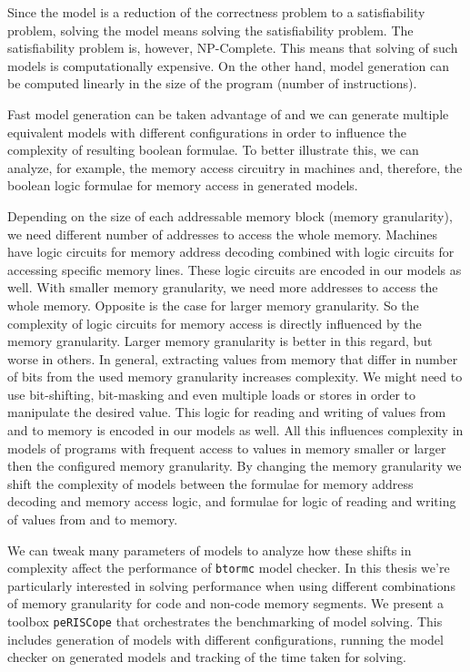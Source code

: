 \documentclass[12pt]{article}
\begin{document}
Since the model is a reduction of the correctness problem to a satisfiability
problem, solving the model means solving the satisfiability problem. The
satisfiability problem is, however, NP-Complete. This means that solving of
such models is computationally expensive. On the other hand, model generation
can be computed linearly in the size of the program (number of instructions).

Fast model generation can be taken advantage of and we can generate multiple
equivalent models with different configurations in order to influence the
complexity of resulting boolean formulae. To better illustrate this, we can
analyze, for example, the memory access circuitry in machines and, therefore,
the boolean logic formulae for memory access in generated models.

Depending on the size of each addressable memory block (memory granularity), we
need different number of addresses to access the whole memory. Machines have
logic circuits for memory address decoding combined with logic circuits for
accessing specific memory lines. These logic circuits are encoded in our models
as well. With smaller memory granularity, we need more addresses to access the
whole memory. Opposite is the case for larger memory granularity. So the
complexity of logic circuits for memory access is directly influenced by the
memory granularity. Larger memory granularity is better in this regard, but
worse in others. In general, extracting values from memory that differ in
number of bits from the used memory granularity increases complexity. We might
need to use bit-shifting, bit-masking and even multiple loads or stores in
order to manipulate the desired value. This logic for reading and writing of
values from and to memory is encoded in our models as well. All this influences
complexity in models of programs with frequent access to values in memory
smaller or larger then the configured memory granularity. By changing the
memory granularity we shift the complexity of models between the formulae for
memory address decoding and memory access logic, and formulae for logic of
reading and writing of values from and to memory.

We can tweak many parameters of models to analyze how these shifts in
complexity affect the performance of \texttt{btormc} model checker. In this
thesis we're particularly interested in solving performance when using
different combinations of memory granularity for code and non-code memory
segments. We present a toolbox \texttt{peRISCope} that orchestrates the
benchmarking of model solving. This includes generation of models with
different configurations, running the model checker on generated models and
tracking of the time taken for solving.
\end{document}
